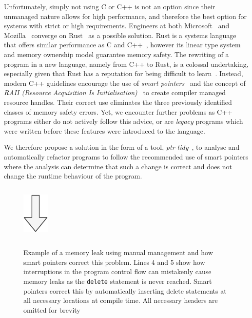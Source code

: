 \documentclass{mpaper}
\begin{document}
    
    Unfortunately, simply not using C or C++ is not an option since their unmanaged nature allows for high performance, and therefore the best option for systems with strict or high requirements.
    Engineers at both Microsoft~\cite{Thomas2019} and Mozilla~\cite{Hostfelt2019} converge on Rust~\cite{Balasubramanian2017} as a possible solution.
    Rust is a systems language that offers similar performance as C and C++~\cite{Lin2016}, however its linear type system and memory ownership model guarantee memory safety.
    The rewriting of a program in a new language, namely from C++ to Rust, is a colossal undertaking, especially given that Rust has a reputation for being difficult to learn~\cite{Astrauskas2019}.
    Instead, modern C++ guidelines encourage the use of \emph{smart pointers}~\cite{Dimov2003} and the concept of \emph{RAII (Resource Acquisition Is Initialisation)}~\cite{Stroustrup2000} to create compiler managed resource handles.
    Their correct use eliminates the three previously identified classes of memory safety errors.
    Yet, we encounter further problems as C++ programs either do not actively follow this advice, or are \emph{legacy} programs which were written before these features were introduced to the language.
    
    We therefore propose a solution in the form of a tool, \emph{ptr-tidy}~\cite{Usov2021}, to analyse and automatically refactor programs to follow the recommended use of smart pointers where the analysis can determine that such a change is correct and does not change the runtime behaviour of the program. 
    
    \begin{figure}
        \centering
        \inputminted{c++}{code/leak.cpp}
        \includegraphics{images/arrow.pdf}
        \inputminted{c++}{code/fix-leak.cpp}
        \caption{Example of a memory leak using manual management and how smart pointers correct this problem. Lines 4 and 5 show how interruptions in the program control flow can mistakenly cause memory leaks as the \texttt{delete} statement is never reached. Smart pointers correct this by automatically inserting delete statements at all necessary locations at compile time. All necessary headers are omitted for brevity}
        \label{lst:motivating-example}
    \end{figure}
    
\end{document}
